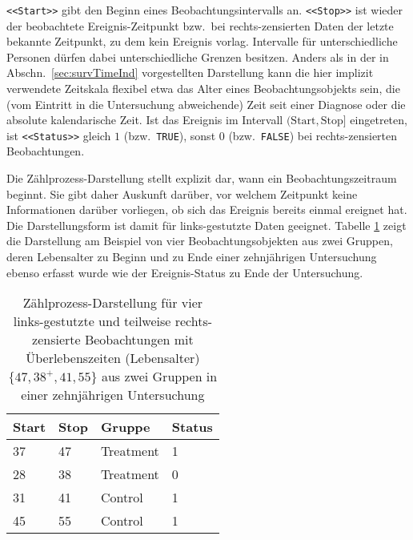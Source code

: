 \lstinline!<<Start>>! gibt den Beginn eines Beobachtungsintervalls an. \lstinline!<<Stop>>! ist wieder der beobachtete Ereignis-Zeitpunkt bzw.\ bei rechts-zensierten Daten der letzte bekannte Zeitpunkt, zu dem kein Ereignis vorlag. Intervalle für unterschiedliche Personen dürfen dabei unterschiedliche Grenzen besitzen. Anders als in der in Abschn.\ \ref{sec:survTimeInd} vorgestellten Darstellung kann die hier implizit verwendete Zeitskala flexibel etwa das Alter eines Beobachtungsobjekts sein, die (vom Eintritt in die Untersuchung abweichende) Zeit seit einer Diagnose oder die absolute kalendarische Zeit. Ist das Ereignis im Intervall $(\text{Start}, \text{Stop}]$ eingetreten, ist \lstinline!<<Status>>! gleich $1$ (bzw.\ \lstinline!TRUE!), sonst $0$ (bzw.\ \lstinline!FALSE!) bei rechts-zensierten Beobachtungen.

Die Zählprozess-Darstellung stellt explizit dar, wann ein Beobachtungszeitraum beginnt. Sie gibt daher Auskunft darüber, vor welchem Zeitpunkt keine Informationen darüber vorliegen, ob sich das Ereignis bereits einmal ereignet hat. Die Darstellungsform ist damit für links-gestutzte Daten geeignet. Tabelle \ref{tab:survLeftCens} zeigt die Darstellung am Beispiel von vier Beobachtungsobjekten aus zwei Gruppen, deren Lebensalter zu Beginn und zu Ende einer zehnjährigen Untersuchung ebenso erfasst wurde wie der Ereignis-Status zu Ende der Untersuchung.

\begin{table}[ht]
\centering
\caption{Zählprozess-Darstellung für vier links-gestutzte und teilweise rechts-zensierte Beobachtungen mit Überlebenszeiten (Lebensalter) $\{47, 38^{+}, 41, 55\}$ aus zwei Gruppen in einer zehnjährigen Untersuchung}
\label{tab:survLeftCens}
\begin{tabular}{llll}
\hline
\sffamily Start & \sffamily Stop & \sffamily Gruppe & \sffamily Status\\\hline\hline
37              & 47             & Treatment        & 1 \\
28              & 38             & Treatment        & 0 \\
31              & 41             & Control          & 1 \\
45              & 55             & Control          & 1 \\\hline
\end{tabular}
\end{table}

